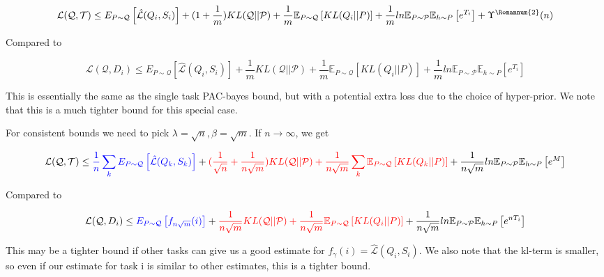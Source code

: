 \documentclass[letterpaper]{article}
\theoremstyle{definition}
\begin{document}
$$\mathcal{L}(\mathcal{Q}, \mathcal{T}) \leq  E_{P\sim \mathcal{Q}}  \left [ \hat{\mathcal{L}}(Q_i,S_i) \right ] + (1+\frac{1}{m})KL(\mathcal{Q}||\mathcal{P}) + \frac{1}{m}\mathbb{E}_{P\sim \mathcal{Q}} \left [KL(Q_i||P)\right ] + \frac{1}{m} ln\mathbb{E}_{P\sim \mathcal{P}}\mathbb{E}_{h\sim P}\left [ e^{T_i} \right ] + \Upsilon^{\text{\Romannum{2}}}(n)$$

Compared to 


$$\mathcal{L}(\mathcal{Q}, D_i)\leq E_{P\sim \mathcal{Q}}  \left [ \hat{\mathcal{L}}(Q_i,S_i) \right ] + \frac{1}{m}KL(\mathcal{Q}||\mathcal{P}) + \frac{1}{m}\mathbb{E}_{P\sim \mathcal{Q}} \left [KL(Q_i||P)\right ] + \frac{1}{m} ln\mathbb{E}_{P\sim \mathcal{P}}\mathbb{E}_{h\sim P}\left [ e^{T_i} \right ] $$

This is essentially the same as the single task PAC-bayes bound, but with a potential extra loss due to the choice of hyper-prior. We note that this is a much tighter bound for this special case.

For consistent bounds we need to pick $\lambda=\sqrt{n}, \beta=\sqrt{m}$. 
If $n\rightarrow\infty$, we get 

$$\mathcal{L}(\mathcal{Q}, \mathcal{T}) \leq \textcolor{blue}{\frac{1}{n}\sum_k E_{P\sim \mathcal{Q}} \left [ \hat{\mathcal{L}}(Q_k,S_k) \right ]} + \textcolor{red}{(\frac{1}{\sqrt{n}}+\frac{1}{n\sqrt{m}})KL(\mathcal{Q}||\mathcal{P})+\frac{1}{n\sqrt{m}}\sum_k \mathbb{E}_{P\sim \mathcal{Q}} \left [KL(Q_k||P) \right ]} + \frac{1}{n\sqrt{m}} ln\mathbb{E}_{P\sim \mathcal{P}}\mathbb{E}_{h\sim P}\left [ e^{M} \right ]$$


Compared to 

$$\mathcal{L}(\mathcal{Q}, D_i)\leq \textcolor{blue}{E_{P\sim \mathcal{Q}}  \left [ f_{n\sqrt{m}}(i) \right ]}  + \textcolor{red}{\frac{1}{n\sqrt{m}}KL(\mathcal{Q}||\mathcal{P})+\frac{1}{n\sqrt{m}}\mathbb{E}_{P\sim \mathcal{Q}} \left [KL(Q_i||P)\right ]} + \frac{1}{n\sqrt{m}} ln\mathbb{E}_{P\sim \mathcal{P}}\mathbb{E}_{h\sim P}\left [ e^{nT_i}\right ]  $$


This may be a tighter bound if other tasks can give us a good estimate for $f_{\gamma}(i)=\hat{\mathcal{L}}(Q_i,S_i)$. We also note that the kl-term is smaller, so even if our estimate for task i is similar to other estimates, this is a tighter bound.
\end{document}
